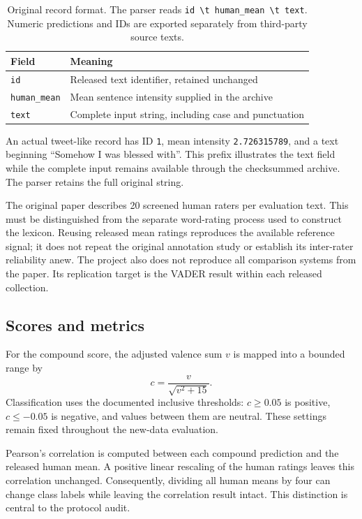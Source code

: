\documentclass[11pt]{article}
\begin{document}
\begin{table}[t]
\centering\small
\begin{tabularx}{\columnwidth}{lX}
\toprule
Field & Meaning\\
\midrule
\texttt{id} & Released text identifier, retained unchanged\\
\texttt{human\_mean} & Mean sentence intensity supplied in the archive\\
\texttt{text} & Complete input string, including case and punctuation\\
\bottomrule
\end{tabularx}
\caption{Original record format. The parser reads
\texttt{id\,\textbackslash t\,human\_mean\,\textbackslash t\,text}.
Numeric predictions and IDs are exported separately from third-party source texts.}
\label{tab:format}
\end{table}

An actual tweet-like record has ID \texttt{1}, mean intensity
\texttt{2.726315789}, and a text beginning ``Somehow I was blessed with''.
This prefix illustrates the text field while the complete input remains available
through the checksummed archive. The parser retains the full original string.

The original paper describes 20 screened human raters per evaluation text. This
must be distinguished from the separate word-rating process used to construct
the lexicon. Reusing released mean ratings reproduces the available reference
signal; it does not repeat the original annotation study or establish its
inter-rater reliability anew. The project also does not reproduce all comparison
systems from the paper. Its replication target is the VADER result within each
released collection.

\subsection{Scores and metrics}
For the compound score, the adjusted valence sum $v$ is mapped into a bounded
range by
\begin{equation}
c=\frac{v}{\sqrt{v^2+15}}.
\end{equation}
Classification uses the documented inclusive thresholds: $c\geq0.05$ is positive,
$c\leq-0.05$ is negative, and values between them are neutral. These settings
remain fixed throughout the new-data evaluation.

Pearson's correlation is computed between each compound prediction and the
released human mean. A positive linear rescaling of the human ratings leaves
this correlation unchanged. Consequently, dividing all human means by four can
change class labels while leaving the correlation result intact. This distinction
is central to the protocol audit.
\end{document}
